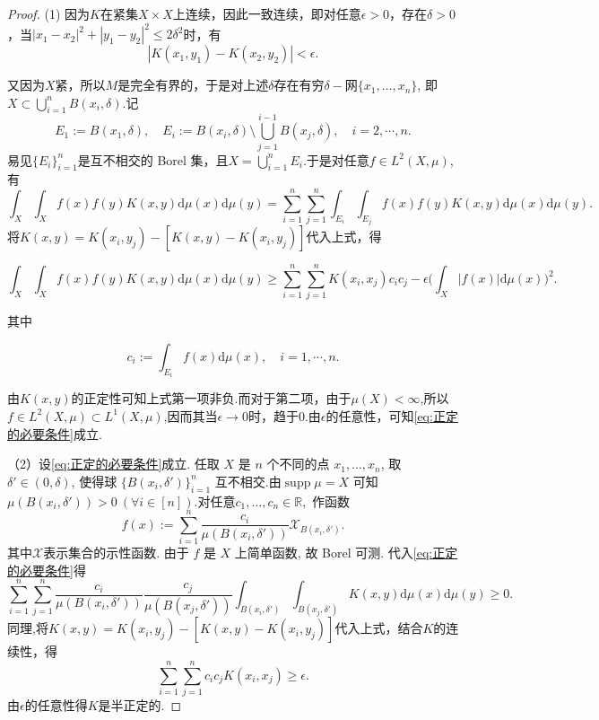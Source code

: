 \documentclass[../master.tex]{subfiles}
\begin{document}
\begin{proof}
    (1) 因为$K$在紧集$X\times X$上连续，因此一致连续，即对任意$\epsilon>0$，存在$\delta>0$，当$|x_1-x_2|^2+|y_1-y_2|^2\leq 2\delta^2$时，有
    \begin{equation*}
        |K(x_1,y_1)-K(x_2,y_2)|<\epsilon.
    \end{equation*}
    
    又因为$X$紧，所以$M$是完全有界的，于是对上述$\delta$存在有穷$\delta-$网$\{x_1,\dots,x_n\}$, 即$X\subset\bigcup _{i=1}^n B(x_i,\delta)$.记
    \begin{equation*}
        E_1:=B(x_1,\delta),\quad E_i:=B(x_i,\delta)\setminus\bigcup_{j=1}^{i-1}B(x_j,\delta),\quad i=2,\cdots,n.
    \end{equation*}
    易见$\{E_i\}_{i=1}^n$是互不相交的 Borel 集，且$X=\bigcup_{i=1}^nE_i.$于是对任意$f\in L^2(X,\mu)$,有
    \begin{equation*}
\int_X\int_Xf(x)f(y)K(x,y)\mathrm{d}\mu(x)\mathrm{d}\mu(y)=\sum_{i=1}^n\sum_{j=1}^n\int_{E_i}\int_{E_j}f(x)f(y)K(x,y)\mathrm{d}\mu(x)\mathrm{d}\mu(y).
    \end{equation*}
    将$K(x,y)=K(x_{i},y_{j})-[K(x,y)-K(x_{i},y_{j})]$代入上式，得

$$\int_X\int_Xf(x)f(y)K(x,y)\mathrm{d}\mu(x)\mathrm{d}\mu(y)\geq\sum_{i=1}^n\sum_{j=1}^nK(x_i,x_j)c_ic_j-\epsilon\Big(\int_X|f(x)|\mathrm{d}\mu(x)\Big)^2.$$

其中

$$c_i:=\int_{E_i}f(x)\mathrm{d}\mu(x),\quad i=1,\cdots,n.$$

由$K(x,y)$的正定性可知上式第一项非负.而对于第二项，由于$\mu(X)<\infty$,所以
$f\in L^{2}(X,\mu)\subset L^{1}(X,\mu)$,因而其当$\epsilon\to0$时，趋于0.由$\epsilon$的任意性，可知\eqref{eq:正定的必要条件}成立.

（2）设\eqref{eq:正定的必要条件}成立. 任取 $X$ 是 $n$ 个不同的点 $x_1,\dots,x_n$, 取$ \delta'\in (0,\delta)$, 使得球 $\{B(x_i, \delta')\}^{n}_{i=1}$ 互不相交.由$\operatorname{supp}\mu=X$ 可知$\mu(B(x_i,\delta'))>0~(\forall i\in[n])$.对任意$c_1,\dots, c_n \in \mathbb{R},$ 作函数
$$f(x) := \sum^{n}_{i=1} \frac{c_i}{\mu(B(x_i, \delta'))} \mathcal{X}_{B(x_i, \delta')}.$$
其中$\mathcal{X}$表示集合的示性函数. 由于 $f$ 是 $X$ 上简单函数, 故 Borel 可测. 代入\eqref{eq:正定的必要条件}得
\begin{equation}\label{eq:微分中值定理}
    \sum^{n}_{i=1} \sum^{n}_{j=1} \frac{c_i}{\mu(B(x_i, \delta'))} \frac{c_j}{\mu(B(x_j, \delta'))} \int_{B(x_i, \delta')} \int_{B(x_j, \delta')} K(x, y) \mathrm{d}μ(x) \mathrm{d}μ(y) \geq  0.
\end{equation}
同理,将$K(x,y)=K(x_{i},y_{j})-[K(x,y)-K(x_{i},y_{j})]$代入上式，结合$K$的连续性，得
\begin{equation}\label{eq: K的半正定性转}
    \sum^{n}_{i=1} \sum^{n}_{j=1} c_ic_jK(x_i,x_j) \geq  \epsilon.
\end{equation}
由$\epsilon$的任意性得$K$是半正定的.

\end{proof}
\end{document}
